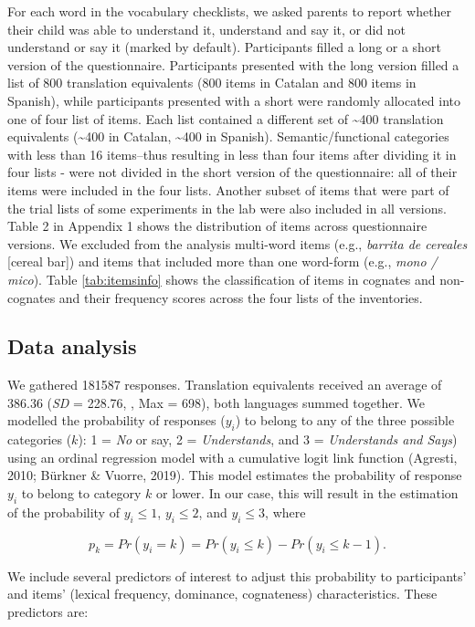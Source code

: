 \documentclass[
  english,
  man,man,floatsintext]{apa6}
\begin{document}
For each word in the vocabulary checklists, we asked parents to report whether their child was able to understand it, understand and say it, or did not understand or say it (marked by default). Participants filled a long or a short version of the questionnaire. Participants presented with the long version filled a list of 800 translation equivalents (800 items in Catalan and 800 items in Spanish), while participants presented with a short were randomly allocated into one of four list of items. Each list contained a different set of \textasciitilde400 translation equivalents (\textasciitilde400 in Catalan, \textasciitilde400 in Spanish). Semantic/functional categories with less than 16 items--thus resulting in less than four items after dividing it in four lists - were not divided in the short version of the questionnaire: all of their items were included in the four lists. Another subset of items that were part of the trial lists of some experiments in the lab were also included in all versions. Table 2 in Appendix 1 shows the distribution of items across questionnaire versions. We excluded from the analysis multi-word items (e.g., \emph{barrita de cereales} {[}cereal bar{]}) and items that included more than one word-form (e.g., \emph{mono / mico}). Table \ref{tab:itemsinfo} shows the classification of items in cognates and non-cognates and their frequency scores across the four lists of the inventories.

\hypertarget{data-analysis}{%
\subsection{Data analysis}\label{data-analysis}}

We gathered 181587 responses. Translation equivalents received an average of 386.36 (\emph{SD} = 228.76, , Max = 698), both languages summed together. We modelled the probability of responses (\(y_i\)) to belong to any of the three possible categories (\(k\)): 1 = \emph{No} or say, 2 = \emph{Understands}, and 3 = \emph{Understands and Says}) using an ordinal regression model with a cumulative logit link function (Agresti, 2010; Bürkner \& Vuorre, 2019). This model estimates the probability of response \(y_i\) to belong to category \(k\) or lower. In our case, this will result in the estimation of the probability of \(y_i \leq 1\), \(y_i \leq 2\), and \(y_i \leq 3\), where

\[
p_k = Pr(y_i = k) = Pr(y_i \leq k) - Pr(y_i \leq k-1).
\]

We include several predictors of interest to adjust this probability to participants' and items' (lexical frequency, dominance, cognateness) characteristics. These predictors are:
\end{document}
